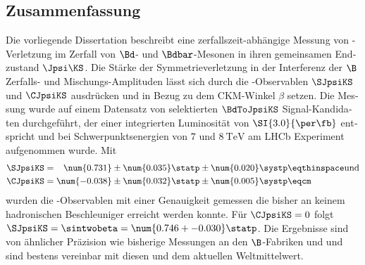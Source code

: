 \vspace{5ex}
\begin{german}
\section*{Zusammenfassung}
Die vorliegende Dissertation beschreibt eine zerfallszeit-abhängige Messung von
\CP-Verletzung im Zerfall von $\Bd$- und $\Bdbar$-Mesonen in ihren gemeinsamen
Endzustand $\Jpsi\KS$. Die Stärke der Symmetrieverletzung in der Interferenz der
$\B$ Zerfalls- und Mischungs-Amplituden lässt sich durch die \CP-Observablen
$\SJpsiKS$ und $\CJpsiKS$ ausdrücken und in Bezug zu dem \acs{CKM}-Winkel
$\beta$ setzen. Die Messung wurde auf einem Datensatz von selektierten
$\BdToJpsiKS$ Signal-Kandidaten durchgeführt, der einer integrierten Luminosität
von $\SI{3.0}{\per\fb}$ entspricht und bei Schwerpunktsenergien von $\num{7}$
und $\SI{8}{\TeV}$ am \acs{LHCb} Experiment aufgenommen wurde. Mit
%
\begin{equation*}
  \begin{split}
    \SJpsiKS &= \phantom{-}\num{0.731} \pm \num{0.035} \statp \pm \num{0.020} \systp \eqthinspace\text{und} \\
    \CJpsiKS &=           \num{-0.038} \pm \num{0.032} \statp \pm \num{0.005} \systp \eqcm
  \end{split}
\end{equation*}
%
wurden die \CP-Observablen mit einer Genauigkeit gemessen die bisher an keinem
hadronischen Beschleuniger erreicht werden konnte. Für $\CJpsiKS = 0$ folgt
$\SJpsiKS = \sintwobeta = \num{0.746 +- 0.030}\statp$. Die Ergebnisse sind von
ähnlicher Präzision wie bisherige Messungen an den $\B$-Fabriken \Babar und
\Belle und sind bestens vereinbar mit diesen und dem aktuellen Weltmittelwert.
\end{german}

\setcounter{page}{1}
